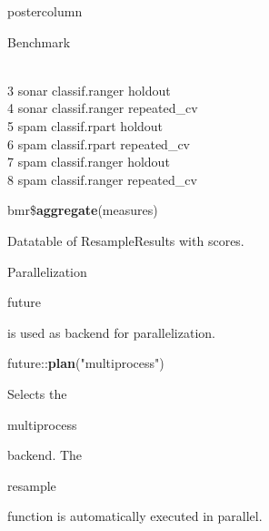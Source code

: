 \documentclass{beamer}
\newcommand{\codeinline}[1]{\begin{codeboxinline}#1\end{codeboxinline}}
\begin{document}
\begin{withoutheader}
\begin{frame}[fragile]{}
\begin{columns}
\begin{column}{.245\textwidth}
\begin{beamercolorbox}[center]{postercolumn}
\begin{minipage}{.98\textwidth}
{\begin{myblock}{Benchmark}
\begin{codeboxmultiline}[width=27cm]
{								\space\space\space\space\space 0\\
								3 \space\space\space sonar classif.ranger
								\space\space\space\space\space\space holdout
								\space\space\space\space 1
								\space\space\space\space\space\space{}
								\space\space\space\space\space 0\\
								4 \space\space\space sonar classif.ranger
								\space\space repeated\_cv
								\space{}00
								\space\space\space\space\space\space{}
								\space\space\space\space{}\\
								5 \space\space\space\space spam
								\space classif.rpart
								\space\space\space\space\space\space holdout
								\space\space\space\space 1
								\space\space\space\space\space\space\space 0
								\space\space\space\space\space 0\\
								6 \space\space\space\space spam
								\space  classif.rpart
								\space\space repeated\_cv
								\space{}
								\space\space\space\space\space\space{}
								\space\space\space\space{}\\
								7 \space\space\space\space spam
								classif.ranger
								\space\space\space\space\space\space holdout
								\space\space\space{}
								\space\space\space\space\space\space{}
								\space\space\space\space{}\\
								8 \space\space\space\space spam
								classif.ranger
								\space\space repeated\_cv
								\space{}
								\space\space\space\space\space\space{}
								\space\space\space\space{}
							}
						\end{codeboxmultiline}
						\vspace{1em}
						\begin{codebox}
							bmr\$\textbf{aggregate}(measures)
						\end{codebox}
						Datatable of ResampleResults with scores.
					\end{myblock}
					\begin{myblock}{Parallelization}
						\codeinline{future} is used as backend for parallelization.
						\\
						\begin{codebox}
							future::\textbf{plan}("multiprocess")
						\end{codebox}
						Selects the \codeinline{multiprocess} backend. The \codeinline{resample} function is automatically executed in parallel.

\end{myblock}}
\end{minipage}
\end{beamercolorbox}
\end{column}
\end{columns}
\end{frame}
\end{withoutheader}
\end{document}
